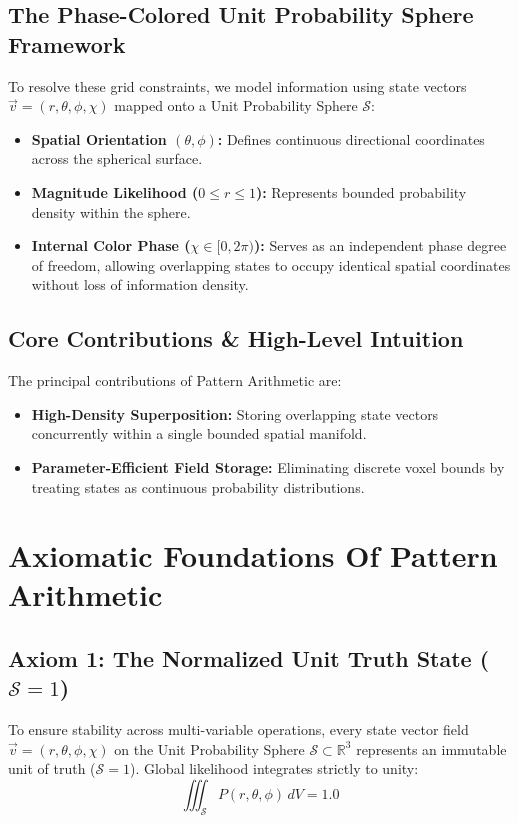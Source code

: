 \documentclass[12pt, a4paper]{article}
\begin{document}
\subsection{The Phase-Colored Unit Probability Sphere Framework}
To resolve these grid constraints, we model information using state vectors $\vec{v} = (r, \theta, \phi, \chi)$ mapped onto a Unit Probability Sphere $\mathcal{S}$:
\begin{itemize}
    \item \textbf{Spatial Orientation $(\theta, \phi)$:} Defines continuous directional coordinates across the spherical surface.
    \item \textbf{Magnitude Likelihood ($0 \leq r \leq 1$):} Represents bounded probability density within the sphere.
    \item \textbf{Internal Color Phase ($\chi \in [0, 2\pi)$):} Serves as an independent phase degree of freedom, allowing overlapping states to occupy identical spatial coordinates without loss of information density.
\end{itemize}

\subsection{Core Contributions \& High-Level Intuition}
The principal contributions of Pattern Arithmetic are:
\begin{itemize}
    \item \textbf{High-Density Superposition:} Storing overlapping state vectors concurrently within a single bounded spatial manifold.
    \item \textbf{Parameter-Efficient Field Storage:} Eliminating discrete voxel bounds by treating states as continuous probability distributions.
\end{itemize}

\section{Axiomatic Foundations Of Pattern Arithmetic}

\subsection{Axiom 1: The Normalized Unit Truth State ($\mathcal{S} = 1$)}
\label{subsec:axiom1}
To ensure stability across multi-variable operations, every state vector field $\vec{v} = (r, \theta, \phi, \chi)$ on the Unit Probability Sphere $\mathcal{S} \subset \mathbb{R}^3$ represents an immutable unit of truth ($\mathcal{S} = 1$). Global likelihood integrates strictly to unity:
\begin{equation}
    \iiint_{\mathcal{S}} P(r, \theta, \phi) \, dV = 1.0
    \label{eq:unit_truth}
\end{equation}
\end{document}
